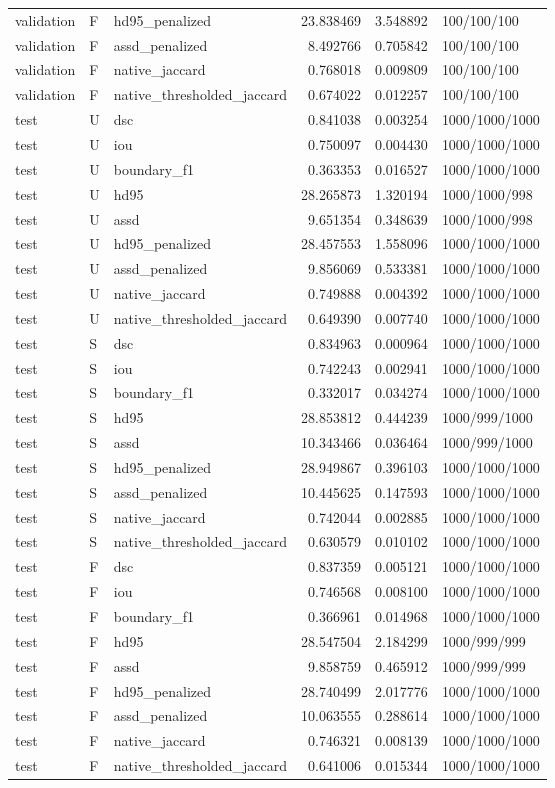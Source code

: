 \begin{tabular}{lllrrl}
validation & F & hd95\_penalized & 23.838469 & 3.548892 & 100/100/100 \\
validation & F & assd\_penalized & 8.492766 & 0.705842 & 100/100/100 \\
validation & F & native\_jaccard & 0.768018 & 0.009809 & 100/100/100 \\
validation & F & native\_thresholded\_jaccard & 0.674022 & 0.012257 & 100/100/100 \\
test & U & dsc & 0.841038 & 0.003254 & 1000/1000/1000 \\
test & U & iou & 0.750097 & 0.004430 & 1000/1000/1000 \\
test & U & boundary\_f1 & 0.363353 & 0.016527 & 1000/1000/1000 \\
test & U & hd95 & 28.265873 & 1.320194 & 1000/1000/998 \\
test & U & assd & 9.651354 & 0.348639 & 1000/1000/998 \\
test & U & hd95\_penalized & 28.457553 & 1.558096 & 1000/1000/1000 \\
test & U & assd\_penalized & 9.856069 & 0.533381 & 1000/1000/1000 \\
test & U & native\_jaccard & 0.749888 & 0.004392 & 1000/1000/1000 \\
test & U & native\_thresholded\_jaccard & 0.649390 & 0.007740 & 1000/1000/1000 \\
test & S & dsc & 0.834963 & 0.000964 & 1000/1000/1000 \\
test & S & iou & 0.742243 & 0.002941 & 1000/1000/1000 \\
test & S & boundary\_f1 & 0.332017 & 0.034274 & 1000/1000/1000 \\
test & S & hd95 & 28.853812 & 0.444239 & 1000/999/1000 \\
test & S & assd & 10.343466 & 0.036464 & 1000/999/1000 \\
test & S & hd95\_penalized & 28.949867 & 0.396103 & 1000/1000/1000 \\
test & S & assd\_penalized & 10.445625 & 0.147593 & 1000/1000/1000 \\
test & S & native\_jaccard & 0.742044 & 0.002885 & 1000/1000/1000 \\
test & S & native\_thresholded\_jaccard & 0.630579 & 0.010102 & 1000/1000/1000 \\
test & F & dsc & 0.837359 & 0.005121 & 1000/1000/1000 \\
test & F & iou & 0.746568 & 0.008100 & 1000/1000/1000 \\
test & F & boundary\_f1 & 0.366961 & 0.014968 & 1000/1000/1000 \\
test & F & hd95 & 28.547504 & 2.184299 & 1000/999/999 \\
test & F & assd & 9.858759 & 0.465912 & 1000/999/999 \\
test & F & hd95\_penalized & 28.740499 & 2.017776 & 1000/1000/1000 \\
test & F & assd\_penalized & 10.063555 & 0.288614 & 1000/1000/1000 \\
test & F & native\_jaccard & 0.746321 & 0.008139 & 1000/1000/1000 \\
test & F & native\_thresholded\_jaccard & 0.641006 & 0.015344 & 1000/1000/1000 \\
\end{tabular}
